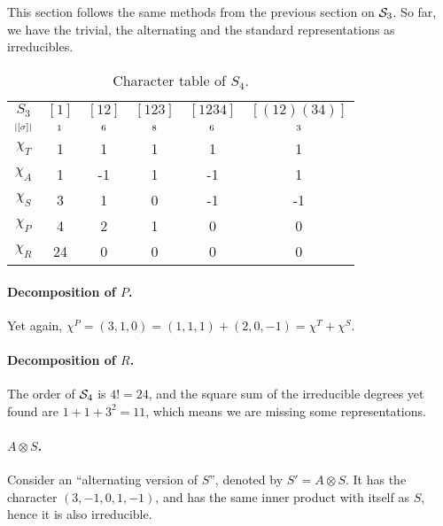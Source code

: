 \begin{example}
	This section follows the same methods from the previous section on $\mathcal{S}_3$. So far, we have the trivial, the alternating and the standard representations as irreducibles. 
	
		\begin{table}[hbt!]
		\centering
		\begin{tabular}{c | c c c c c}
			$S_3$      & $[1]$   & $[12]$  & $[123]$ & $[1234]$ & $[(12)(34)]$ \\
			$\scriptstyle|[\sigma]|$ & $\scriptstyle 1$ & $\scriptstyle 6$ & $\scriptstyle 8$ & $\scriptstyle 6$  & $\scriptstyle 3$      \\ \hline
			$\chi_T$     & 1       & 1       & 1       & 1        & 1            \\
			$\chi_A$     & 1       & -1      & 1       & -1       & 1            \\
			$\chi_S$     & 3       & 1       & 0       & -1       & -1           \\ \hline\hline
			$\chi_P$     & 4       & 2       & 1       & 0        & 0            \\
			$\chi_R$     & 24      & 0       & 0       & 0        & 0            	\end{tabular}
		\caption{Character table of $S_4$.}
		\label{table:charS4}
	\end{table}
	
	\paragraph{Decomposition of $P$.} Yet again, $\chi^P = (3,1,0) = (1,1,1) + (2,0,-1) = \chi^T + \chi^S$.
	
	\paragraph{Decomposition of $R$.}  The order of $\mathcal{S}_4$ is $4! = 24$, and the square sum of the irreducible degrees yet found are $1 + 1 + 3^2 = 11$, which means we are missing some representations.
	
	\paragraph{$A \otimes S$.} Consider an ``alternating version of $S$'', denoted by $S' = A \otimes S$. It has the character $(3,-1,0,1,-1)$, and has the same inner product with itself as $S$, hence it is also irreducible. 
	

\end{example}
